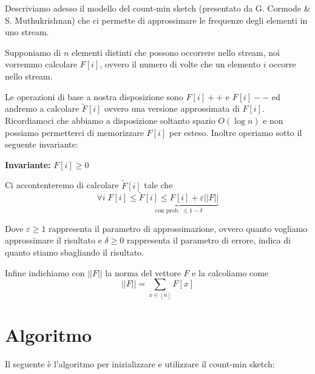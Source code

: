 \documentclass[a4paper,11pt]{book}
\begin{document}
Descriviamo adesso il modello del count-min sketch (presentato da G. Cormode \& S. Muthukrishnan) che ci permette di approssimare le frequenze degli elementi in uno stream. 

Supponiamo di $n$ elementi distinti che possono occorrere nello stream, noi vorremmo calcolare $F[i]$, ovvero il numero di volte che un elemento $i$ occorre nello stream.

Le operazioni di base a nostra disposizione sono $F[i]++$ e $F[i]--$ ed andremo a calcolare $\tilde{F}[i]$ ovvero una versione approssimata di $F[i]$. Ricordiamoci che abbiamo a disposizione soltanto spazio $O(\log n)$ e non possiamo permetterci di memorizzare $F[i]$ per esteso. Inoltre operiamo sotto il seguente invariante:

\textbf{Invariante:} $F[i] \geq 0$

Ci accontenteremo di calcolare  $\tilde{F}[i]$ tale che 
$$\forall i \; F[i] \leq \underbrace{\tilde{F}[i] \leq F[i] + \varepsilon ||F||}_{\mbox{con prob.} \; \leq 1-\delta}$$

Dove $\varepsilon \geq 1 $ rappresenta il parametro di approssimazione, ovvero quanto vogliamo approssimare il risultato e $\delta \geq 0$ rappresenta il parametro di errore, indica di quanto stiamo sbagliando il risultato.

Infine indichiamo con $||F||$ la norma del vettore $F$ e la calcoliamo come $$||F|| = \sum_{x \in [n]} F[x]$$

\section{Algoritmo}

Il seguente \`e l'algoritmo per inizializzare e utilizzare il count-min sketch:
\end{document}
